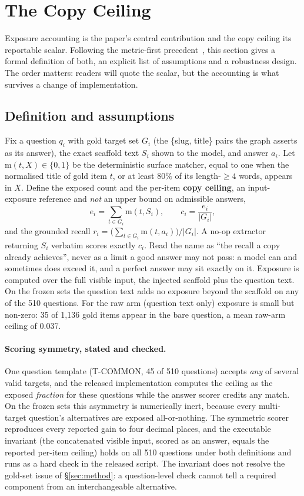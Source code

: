 \documentclass[10pt,twocolumn]{article}
\begin{document}
\section{The Copy Ceiling}\label{sec:ceiling}
Exposure accounting is the paper's central contribution and the copy ceiling its reportable scalar. Following the metric-first precedent~\cite{min2023factscore,gao2023alce}, this section gives a formal definition of both, an explicit list of assumptions and a robustness design. The order matters: readers will quote the scalar, but the accounting is what survives a change of implementation.

\subsection{Definition and assumptions}
Fix a question $q_i$ with gold target set $G_i$ (the \{slug, title\} pairs the graph asserts as its answer), the exact scaffold text $S_i$ shown to the model, and answer $a_i$. Let $\mathrm{m}(t,X)\in\{0,1\}$ be the deterministic surface matcher, equal to one when the normalised title of gold item $t$, or at least $80\%$ of its length-$\geq4$ words, appears in $X$. Define the exposed count and the per-item \textbf{copy ceiling}, an input-exposure reference and \emph{not} an upper bound on admissible answers,
\[
  e_i=\sum_{t\in G_i}\mathrm{m}(t,S_i),\qquad
  c_i=\frac{e_i}{|G_i|},
\]
and the grounded recall $r_i=\bigl(\sum_{t\in G_i}\mathrm{m}(t,a_i)\bigr)/|G_i|$. A no-op extractor returning $S_i$ verbatim scores exactly $c_i$. Read the name as ``the recall a copy already achieves'', never as a limit a good answer may not pass: a model can and sometimes does exceed it, and a perfect answer may sit exactly on it. Exposure is computed over the full visible input, the injected scaffold plus the question text. On the frozen sets the question text adds no exposure beyond the scaffold on any of the 510 questions. For the raw arm (question text only) exposure is small but non-zero: 35 of 1{,}136 gold items appear in the bare question, a mean raw-arm ceiling of 0.037.

\paragraph{Scoring symmetry, stated and checked.} One question template (T-COMMON, 45 of 510 questions) accepts \emph{any} of several valid targets, and the released implementation computes the ceiling as the exposed \emph{fraction} for these questions while the answer scorer credits any match. On the frozen sets this asymmetry is numerically inert, because every multi-target question's alternatives are exposed all-or-nothing. The symmetric scorer reproduces every reported gain to four decimal places, and the executable invariant (the concatenated visible input, scored as an answer, equals the reported per-item ceiling) holds on all 510 questions under both definitions and runs as a hard check in the released script. The invariant does not resolve the gold-set issue of \S\ref{sec:method}: a question-level check cannot tell a required component from an interchangeable alternative.
\end{document}
